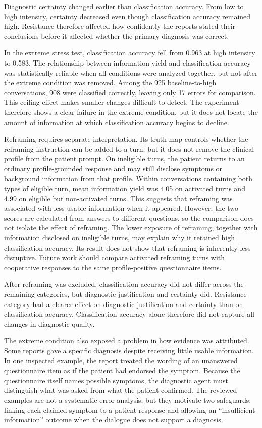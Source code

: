 Diagnostic certainty changed earlier than classification accuracy. From low to high intensity, certainty decreased even though classification accuracy remained high. Resistance therefore affected how confidently the reports stated their conclusions before it affected whether the primary diagnosis was correct.

In the extreme stress test, classification accuracy fell from 0.963 at high intensity to 0.583. The relationship between information yield and classification accuracy was statistically reliable when all conditions were analyzed together, but not after the extreme condition was removed. Among the 925 baseline-to-high conversations, 908 were classified correctly, leaving only 17 errors for comparison. This ceiling effect makes smaller changes difficult to detect. The experiment therefore shows a clear failure in the extreme condition, but it does not locate the amount of information at which classification accuracy begins to decline.

Reframing requires separate interpretation. Its truth map controls whether the reframing instruction can be added to a turn, but it does not remove the clinical profile from the patient prompt. On ineligible turns, the patient returns to an ordinary profile-grounded response and may still disclose symptoms or background information from that profile. Within conversations containing both types of eligible turn, mean information yield was 4.05 on activated turns and 4.99 on eligible but non-activated turns. This suggests that reframing was associated with less usable information when it appeared. However, the two scores are calculated from answers to different questions, so the comparison does not isolate the effect of reframing. The lower exposure of reframing, together with information disclosed on ineligible turns, may explain why it retained high classification accuracy. Its result does not show that reframing is inherently less disruptive. Future work should compare activated reframing turns with cooperative responses to the same profile-positive questionnaire items.

After reframing was excluded, classification accuracy did not differ across the remaining categories, but diagnostic justification and certainty did. Resistance category had a clearer effect on diagnostic justification and certainty than on classification accuracy. Classification accuracy alone therefore did not capture all changes in diagnostic quality.

The extreme condition also exposed a problem in how evidence was attributed. Some reports gave a specific diagnosis despite receiving little usable information. In one inspected example, the report treated the wording of an unanswered questionnaire item as if the patient had endorsed the symptom. Because the questionnaire itself names possible symptoms, the diagnostic agent must distinguish what was asked from what the patient confirmed. The reviewed examples are not a systematic error analysis, but they motivate two safeguards: linking each claimed symptom to a patient response and allowing an ``insufficient information'' outcome when the dialogue does not support a diagnosis.

